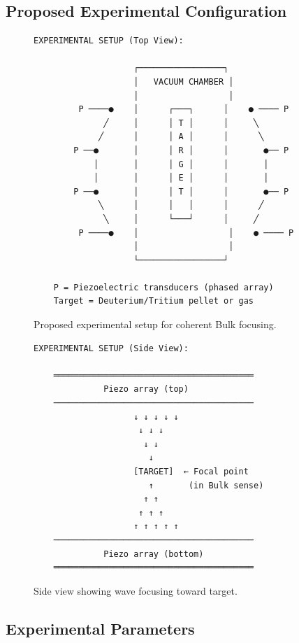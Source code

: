 \documentclass[12pt,a4paper]{article}
\begin{document}
\subsection{Proposed Experimental Configuration}

\begin{figure}[H]
\centering
\begin{verbatim}
EXPERIMENTAL SETUP (Top View):

                    ┌─────────────────┐
                    │   VACUUM CHAMBER │
                    │                  │
         P ────●    │      ┌───┐      │    ● ──── P
              ╱     │      │ T │      │     ╲
             ╱      │      │ A │      │      ╲
        P ──●       │      │ R │      │       ●── P
            │       │      │ G │      │       │
            │       │      │ E │      │       │
        P ──●       │      │ T │      │       ●── P
             ╲      │      │   │      │      ╱
              ╲     │      └───┘      │     ╱
         P ────●    │                  │    ● ──── P
                    │                  │
                    └─────────────────┘
                    
    P = Piezoelectric transducers (phased array)
    Target = Deuterium/Tritium pellet or gas
\end{verbatim}
\caption{Proposed experimental setup for coherent Bulk focusing.}
\end{figure}

\begin{figure}[H]
\centering
\begin{verbatim}
EXPERIMENTAL SETUP (Side View):

    ════════════════════════════════════════
              Piezo array (top)
    ────────────────────────────────────────
                    ↓ ↓ ↓ ↓ ↓
                     ↓ ↓ ↓
                      ↓ ↓
                       ↓
                    [TARGET]  ← Focal point
                       ↑       (in Bulk sense)
                      ↑ ↑
                     ↑ ↑ ↑
                    ↑ ↑ ↑ ↑ ↑
    ────────────────────────────────────────
              Piezo array (bottom)
    ════════════════════════════════════════
\end{verbatim}
\caption{Side view showing wave focusing toward target.}
\end{figure}

\subsection{Experimental Parameters}
\end{document}

